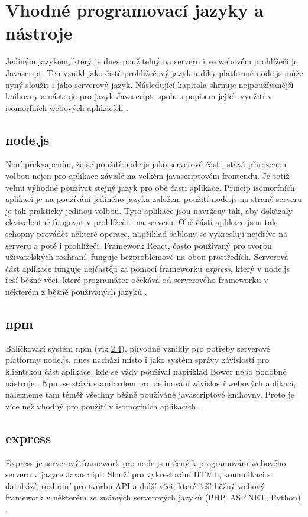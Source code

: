 \section{Vhodné programovací jazyky a nástroje}
Jediným jazykem, který je dnes použitelný na serveru i ve webovém prohlížeči je Javascript. Ten vznikl jako čistě prohlížečový jazyk a díky platformě node.js může nyný sloužit i jako serverový jazyk. Následující kapitola shrnuje nejpoužívanější knihovny a nástroje pro jazyk Javascript, spolu s popisem jejich využití v isomorfních webových aplikacích \cite{isomorhic_book}.

\subsection{node.js}
Není překvapením, že se použití node.js jako serverové části, stává přirozenou volbou nejen pro aplikace závislé na velkém javascriptovém frontendu. Je totiž velmi výhodné používat stejný jazyk pro obě části aplikace. Princip isomorfních aplikací je na používání jediného jazyka založen, použití node.js na straně serveru je tak prakticky jedinou volbou. Tyto aplikace jsou navrženy tak, aby dokázaly ekvivalentně fungovat v prohlížeči i na serveru. Obě části aplikace jsou tak schopny provádět některé operace, například šablony se vykreslují nejdříve na serveru a poté i prohlížeči. Framework React, často používaný pro tvorbu uživatelských rozhraní, funguje bezproblémově na obou prostředích. Serverová část aplikace funguje nejčastěji za pomocí frameworku \textit{express}, který v node.js řeší běžné věci, které programátor očekává od serverového frameworku v některém z běžně používaných jazyků \cite{glover_nodejs} \cite{tilkov_nodejs} \cite{isomorhic_book}.

\subsection{npm}
Balíčkovací systém npm (viz \hyperref[sec:node_js]{2.4}), původně vzniklý pro potřeby serverové platformy node.js, dnes nachází místo i jako systém správy závislostí pro klientskou část aplikace, kde se vždy používal například Bower nebo podobné nástroje \cite{bower}. Npm se stává standardem pro definování závislostí webových aplikací, nalezneme tam téměř všechny běžně používáné javascriptové knihovny. Proto je více než vhodný pro použití v isomorfních aplikacích \cite{npm} \cite{isomorhic_book}.

\subsection{express}
Express je serverový framework pro node.js určený k programování webového serveru v jazyce Javascript. Slouží pro vykreslování HTML, komunikaci s databází, rozhraní pro tvorbu API a další věci, které řeší běžný webový framework v některém ze známých serverových jazyků (PHP, ASP.NET, Python) \cite{express}.

